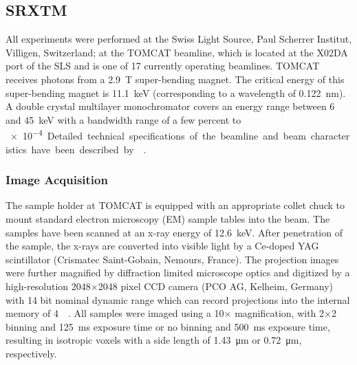 \subsection{SRXTM}
All experiments were performed at the Swiss Light Source, Paul Scherrer Institut, Villigen, Switzerland; at the TOMCAT beamline, which is located at the X02DA port of the SLS and is one of 17 currently operating beamlines. TOMCAT receives photons from a \SI{2.9}{\tesla} super-bending magnet. The critical energy of this super-bending magnet is \SI{11.1}{\kilo\electronvolt} (corresponding to a wavelength of \SI{0.122}{\nano\meter}). A double crystal multilayer monochromator covers an energy range between 6 and \SI{45}{\kilo\electronvolt} with a bandwidth range of a few percent to \SI{e-4}. Detailed technical specifications of the beamline and beam characteristics have been described by~\citeauthor{Stampanoni2006a}~\cite{Stampanoni2006a,Stampanoni2007}.

\subsubsection{Image Acquisition}
\label{seq:Image Acquisition}
The sample holder at TOMCAT is equipped with an appropriate collet chuck to mount standard electron microscopy (EM) sample tables into the beam. The samples have been scanned at an x-ray energy of \SI{12.6}{\kilo\electronvolt}. After penetration of the sample, the x-rays are converted into visible light by a Ce-doped YAG scintillator (Crismatec Saint-Gobain, Nemours, France). The projection images were further magnified by diffraction limited microscope optics and digitized by a high-resolution 2048\(\times\)2048 pixel CCD camera (PCO AG, Kelheim, Germany) with 14 bit nominal dynamic range which can record projections into the internal memory of \SI{4}{\giga\byte}. All samples were imaged using a 10\(\times\) magnification, with 2\(\times\)2 binning and \SI{125}{\milli\second} exposure time or no binning and \SI{500}{\milli\second} exposure time, resulting in isotropic voxels with a side length of \SI{1.43}{\micro\meter} or \SI{0.72}{\micro\meter}, respectively.

